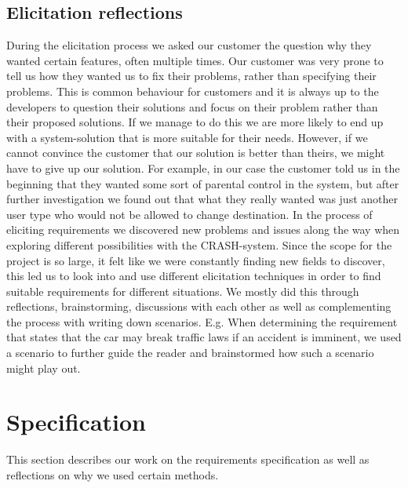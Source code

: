 \documentclass[10pt]{article}
\begin{document}
\subsection{Elicitation reflections}
During the elicitation process we asked our customer the question why they wanted certain features, often multiple times. Our customer was very prone to tell us how they wanted us to fix their problems, rather than specifying their problems. This is common behaviour for customers and it is always up to the developers to question their solutions and focus on their problem rather than their proposed solutions. If we manage to do this we are more likely to end up with a system-solution that is more suitable for their needs. However, if we cannot convince the customer that our solution is better than theirs, we might have to give up our solution. 
For example, in our case the customer told us in the beginning that they wanted some sort of parental control in the system, but after further investigation we found out that what they really wanted was just another user type who would not be allowed to change destination.
\newline
\indent
In the process of eliciting requirements we discovered new problems and issues along the way when exploring different possibilities with the CRASH-system. Since the scope for the project is so large, it felt like we were constantly finding new fields to discover, this led us to look into and use different elicitation techniques in order to find suitable requirements for different situations. We mostly did this through reflections, brainstorming, discussions with each other as well as complementing the process with writing down scenarios. E.g. When determining the requirement that states that the car may break traffic laws if an accident is imminent, we used a scenario to further guide the reader and brainstormed how such a scenario might play out.

\section{Specification}
This section describes our work on the requirements specification as well as reflections on why we used certain methods. 
\end{document}
